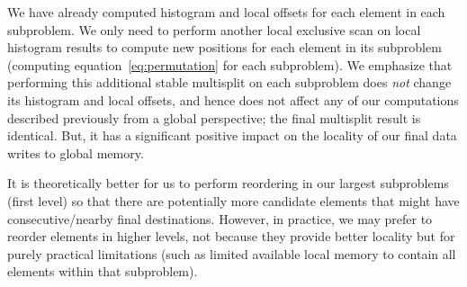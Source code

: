 We have already computed histogram and local offsets for each element in each subproblem. We only need to perform another local exclusive scan on local histogram results to compute new positions for each element in its subproblem (computing equation~\eqref{eq:permutation} for each subproblem).
We emphasize that performing this additional stable multisplit on each subproblem does \emph{not} change its histogram and local offsets, and hence does not affect any of our computations described previously from a global perspective; the final multisplit result is identical. But, it has a significant positive impact on the locality of our final data writes to global memory.

It is theoretically better for us to perform reordering in our largest subproblems (first level) so that there are potentially more candidate elements that might have consecutive/nearby final destinations.
However, in practice, we may prefer to reorder elements in higher levels, not because they provide better locality but for purely practical limitations (such as limited available local memory to contain all elements within that subproblem).


